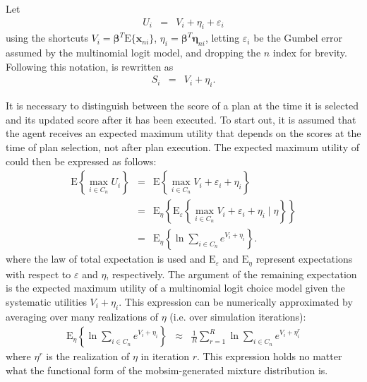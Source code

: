 Let
\begin{eqnarray}
U_{i} & = & V_{i}+\eta_{i}+\varepsilon_{i}\label{eq:full-random-utility-without-time}
\end{eqnarray}
using the shortcuts $V_{i}=\boldsymbol{\beta}^{T}\text{E}\{\mathbf{x}_{ni}\}$,
$\eta_{i}=\boldsymbol{\beta}^{T}\boldsymbol{\eta}_{ni}$, letting
$\varepsilon_{i}$ be the Gumbel error assumed by the multinomial
logit model, and dropping the $n$ index for brevity. Following this
notation,  is rewritten as
\begin{eqnarray}
S_{i} & = & V_{i}+\eta_{i}.\label{eq:score-shorthand}
\end{eqnarray}

It is necessary to distinguish between the score of a plan at the time
it is selected and its updated score after it has been executed.
To start out, it is assumed that the agent receives an expected maximum 
utility that depends on the scores at the time of plan selection,
not after plan execution. The expected maximum utility of
 could then be expressed as follows:
\begin{eqnarray}
\text{E}\left\{\max_{i\in C_n}U_{i}\right\} & = &
\text{E}\left\{\max_{i\in C_n}V_{i}+\varepsilon_{i}+\eta_{i}\right\}\\
 & = & \text{E}_{\eta}\left\{\text{E}_{\varepsilon}\left\{\max_{i\in
 C_n}V_{i}+\varepsilon_{i}+\eta_{i}\mid\eta\right\}\right\}\\
 & = & \text{E}_{\eta}\left\{ \ln\sum_{i\in C_n}e^{V_{i}+\eta_{i}}\right\} .
\end{eqnarray}
where the law of total expectation is used and $\text{E}_{\varepsilon}$
and $\text{E}_{\eta}$ represent expectations with respect to
$\varepsilon$ and $\eta$, respectively. 
The argument of the remaining
expectation is the expected maximum utility of a multinomial logit
choice model given the systematic utilities $V_{i}+\eta_{i}$. This
expression can be numerically approximated by averaging over many
realizations of $\eta$ (i.e. over simulation iterations):
\begin{eqnarray}
\text{E}_{\eta}\left\{ \ln\sum_{i\in C_n}e^{V_{i}+\eta_{i}}\right\}  & \approx & 
\frac{1}{R}\sum_{r=1}^{R}\ln\sum_{i\in
C_n}e^{V_{i}+\eta_{i}^{r}}\label{eq:wartezimmer}
\end{eqnarray}
where $\eta^r$ is the realization of $\eta$ in iteration $r$.
This expression holds no matter what the functional form
of the mobsim-generated mixture distribution is.

